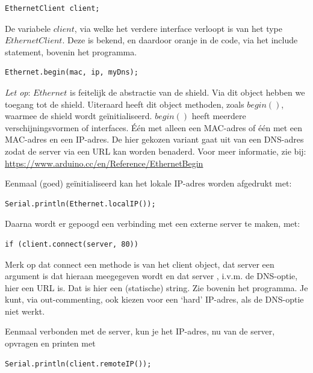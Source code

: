 \begin{lstlisting}[language=Arduino, numbers=none]
EthernetClient client;
\end{lstlisting}

De variabele $client$, via welke het verdere interface verloopt is van het type $EthernetClient$. Deze is bekend, en daardoor oranje in de code, via het include statement, bovenin het programma.

\begin{lstlisting}[language=Arduino, numbers=none]
Ethernet.begin(mac, ip, myDns);
\end{lstlisting}

\begin{remark}
\textit{Let op}: $Ethernet$ is feitelijk de abstractie van de shield. Via dit object hebben we toegang tot de shield. Uiteraard heeft dit object methoden, zoals $begin()$, waarmee de shield wordt geïnitialiseerd. $begin()$ heeft meerdere verschijningsvormen of interfaces. Één met alleen een MAC-adres of één met een MAC-adres en een IP-adres. De hier gekozen variant gaat uit van een DNS-adres zodat de server via een URL kan worden benaderd. Voor meer informatie, zie bij: \url{https://www.arduino.cc/en/Reference/EthernetBegin}
\end{remark}

Eenmaal (goed) geïnitialiseerd kan het lokale IP-adres worden afgedrukt met:

\begin{lstlisting}[language=Arduino, numbers=none]
Serial.println(Ethernet.localIP());
\end{lstlisting}

Daarna wordt er gepoogd een verbinding met een externe server te maken, met:
\begin{lstlisting}[language=Arduino, numbers=none]
if (client.connect(server, 80))
\end{lstlisting}
Merk op dat connect een methode is van het client object, dat server een argument is dat hieraan meegegeven wordt en dat server , i.v.m. de DNS-optie, hier een URL is. Dat is hier een (statische) string. Zie bovenin het programma. Je kunt, via out-commenting, ook kiezen voor een ‘hard’ IP-adres, als de DNS-optie niet werkt. \par
Eenmaal verbonden met de server, kun je het IP-adres, nu van de server, opvragen en printen met 
\begin{lstlisting}[language=Arduino, numbers=none]
Serial.println(client.remoteIP());
\end{lstlisting}

